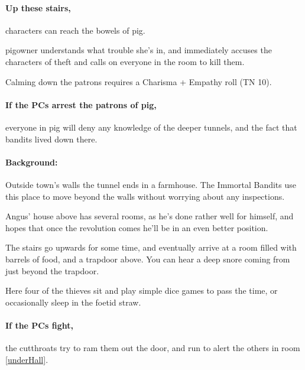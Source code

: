 \begin{multicols}{2}

\paragraph{Up these stairs,}
characters can reach the bowels of \gls{pig}.

\Gls{pigowner} understands what trouble she's in, and immediately accuses the characters of theft and calls on everyone in the room to kill them.

Calming down the patrons requires a Charisma + Empathy roll (TN 10).

\paragraph{If the PCs arrest the patrons of \gls{pig},}
everyone in \gls{pig} will deny any knowledge of the deeper tunnels, and the fact that bandits lived down there.


\paragraph{Background:}
Outside \gls{town}'s walls the tunnel ends in a farmhouse.
The Immortal Bandits use this place to move beyond the walls without worrying about any inspections.

Angus' house above has several rooms, as he's done rather well for himself, and hopes that once the revolution comes he'll be in an even better position.

\begin{boxtext}

  The stairs go upwards for some time, and eventually arrive at a room filled with barrels of food, and a trapdoor above.
  You can hear a deep snore coming from just beyond the trapdoor.

\end{boxtext}



Here four of the thieves sit and play simple dice games to pass the time, or occasionally sleep in the foetid straw.

\paragraph{If the PCs fight,}
the cutthroats try to ram them out the door, and run to alert the others in room \ref{underHall}.


\end{multicols}
